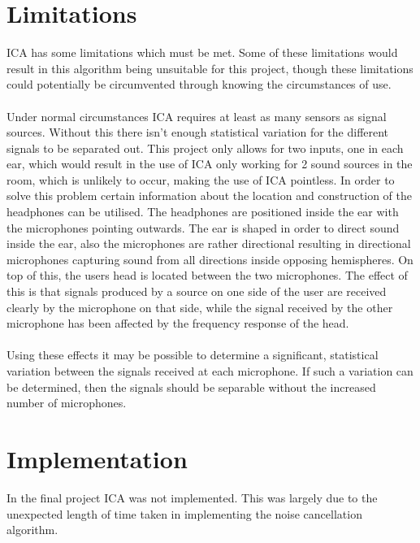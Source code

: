 \section{Limitations}
ICA has some limitations which must be met.
Some of these limitations would result in this algorithm being unsuitable for this project, though these limitations could potentially be circumvented through knowing the circumstances of use.
\\
\\
Under normal circumstances ICA requires at least as many sensors as signal sources.
Without this there isn't enough statistical variation for the different signals to be separated out.
This project only allows for two inputs, one in each ear, which would result in the use of ICA only working for 2 sound sources in the room, which is unlikely to occur, making the use of ICA pointless.
In order to solve this problem certain information about the location and construction of the headphones can be utilised.
The headphones are positioned inside the ear with the microphones pointing outwards.
The ear is shaped in order to direct sound inside the ear, also the microphones are rather directional resulting in directional microphones capturing sound from all directions inside opposing hemispheres.
On top of this, the users head is located between the two microphones.
The effect of this is that signals produced by a source on one side of the user are received clearly by the microphone on that side, while the signal received by the other microphone has been affected by the frequency response of the head.
\\
\\
Using these effects it may be possible to determine a significant, statistical variation between the signals received at each microphone.
If such a variation can be determined, then the signals should be separable without the increased number of microphones.

\section{Implementation}
In the final project ICA was not implemented.
This was largely due to the unexpected length of time taken in implementing the noise cancellation algorithm.
